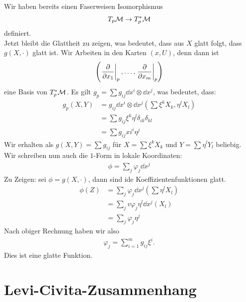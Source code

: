 \begin{bew}
Wir haben bereits einen Faserweisen Isomorphismus
\begin{align*}
T_p\mathcal{M} \to T^\ast_p \mathcal{M}
\end{align*}
definiert.\\
Jetzt bleibt die Glattheit zu zeigen, was bedeutet, dass aus $X$ glatt folgt, dass $g(X, \cdot)$ glatt ist.
Wir Arbeiten in den Karten $(x, U)$, denn dann ist
\begin{align*}
\left( \eval{\pdv{x_1}}_p, \dots,  \eval{\pdv{x_m}}_p \right)
\end{align*}
eine Basis von $T^\ast_p \mathcal{M}$.
Es gilt $g_p = \sum g_{ij} \dd{x^i} \otimes \dd{x^j}$, was bedeutet, dass:
\begin{align*}
g_p (X, Y) &= g_{ij} \dd{x^i} \otimes \dd{x^j} \left( \sum \xi^k X_k, \eta^l X_l\right)\\
&= \sum g_{ij} \xi^k \eta^l \delta_{ik} \delta_{kl}\\
&= \sum g_{ij} xi^i \eta^j
\end{align*}
Wir erhalten als $g(X, Y) = \sum g_{ij}$ für $X= \sum \xi^k X_k$ und $Y= \sum \eta^l Y_l$ beliebig.
Wir schreiben nun auch die $1$-Form in lokale Koordinaten:
\begin{align}
\phi = \sum_j \varphi_j \dd{x^j}
\end{align}
Zu Zeigen: sei $\phi = g(X, \cdot)$, dann sind ide Koeffizientenfunktionen glatt.
\begin{align*}
\phi(Z) &= \sum_j \varphi_j \dd{x^j} \left( \sum \eta^l X_l \right)\\
&= \sum_{j} v\varphi_j \eta^l \dd{x^j} (X_l)\\
&= \sum_j \varphi_j \eta^j
\end{align*}
Nach obiger Rechnung haben wir also
\begin{align}
\varphi_j = \sum^m_{i=1} g_{ij} \xi^i.
\end{align}
Dies ist eine glatte Funktion.
\end{bew}

\section{Levi-Civita-Zusammenhang}

